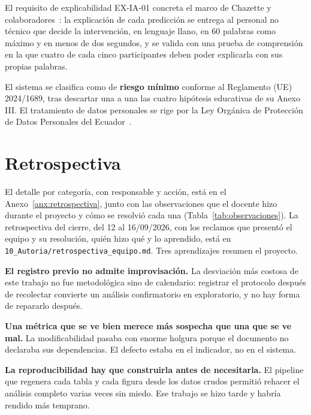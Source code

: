 \documentclass[11pt,a4paper]{article}
\begin{document}
El requisito de explicabilidad EX-IA-01 concreta el marco de Chazette y
colaboradores~\cite{chazette2020explainability,chazette2022explainable}: la explicaci\'on
de cada predicci\'on se entrega al personal no t\'ecnico que decide la intervenci\'on, en
lenguaje llano, en 60 palabras como m\'aximo y en menos de dos segundos, y se valida con
una prueba de comprensi\'on en la que cuatro de cada cinco participantes deben poder
explicarla con sus propias palabras.

El sistema se clasifica como de \textbf{riesgo m\'inimo} conforme al Reglamento (UE)
2024/1689, tras descartar una a una las cuatro hip\'otesis educativas de su Anexo III.
El tratamiento de datos personales se rige por la Ley Org\'anica de Protecci\'on de Datos
Personales del Ecuador~\cite{asamblea2021lopdp}.

\section{Retrospectiva}

El detalle por categor\'ia, con responsable y acci\'on, est\'a en el
Anexo~\ref{anx:retrospectiva}, junto con las observaciones que el docente hizo durante
el proyecto y c\'omo se resolvi\'o cada una (Tabla~\ref{tab:observaciones}). La
retrospectiva del cierre, del 12 al 16/09/2026, con los reclamos que present\'o el equipo y su
resoluci\'on, qui\'en hizo qu\'e y lo aprendido, est\'a en
\nolinkurl{10_Autoria/retrospectiva_equipo.md}. Tres
aprendizajes resumen el proyecto.

\textbf{El registro previo no admite improvisaci\'on.} La desviaci\'on m\'as costosa de
este trabajo no fue metodol\'ogica sino de calendario: registrar el protocolo despu\'es
de recolectar convierte un an\'alisis confirmatorio en exploratorio, y no hay forma de
repararlo despu\'es.

\textbf{Una m\'etrica que se ve bien merece m\'as sospecha que una que se ve mal.} La
modificabilidad pasaba con enorme holgura porque el documento no declaraba sus
dependencias. El defecto estaba en el indicador, no en el sistema.

\textbf{La reproducibilidad hay que construirla antes de necesitarla.} El pipeline que
regenera cada tabla y cada figura desde los datos crudos permiti\'o rehacer el an\'alisis
completo varias veces sin miedo. Ese trabajo se hizo tarde y habr\'ia rendido m\'as
temprano.

\end{document}
